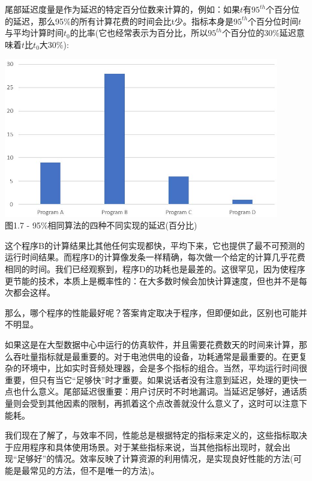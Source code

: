 尾部延迟度量是作为延迟的特定百分位数来计算的，例如：如果$ t $有$95^{th}$个百分位的延迟，那么95\%的所有计算花费的时间会比t少。指标本身是$95^{th}$个百分位时间$ t $与平均计算时间$ t_0 $的比率(它也经常表示为百分比，所以$95^{th}$个百分位的30\%延迟意味着$ t $比$ t_0 $大30\%):

\begin{center}
\includegraphics[width=0.9\textwidth]{content/1/chapter1/images/7.jpg}\\
图1.7 - 95\%相同算法的四种不同实现的延迟(百分比)
\end{center}

这个程序B的计算结果比其他任何实现都快，平均下来，它也提供了最不可预测的运行时间结果。而程序D的计算像发条一样精确，每次做一个给定的计算几乎花费相同的时间。我们已经观察到，程序D的功耗也是最差的。这很罕见，因为使程序更节能的技术，本质上是概率性的：在大多数时候会加快计算速度，但也并不是每次都会这样。

那么，哪个程序的性能最好呢？答案肯定取决于程序，但即便如此，区别也可能并不明显。


如果这是在大型数据中心中运行的仿真软件，并且需要花费数天的时间来计算，那么吞吐量指标就是最重要的。对于电池供电的设备，功耗通常是最重要的。在更复杂的环境中，比如实时音频处理器，会是多个指标的组合。当然，平均运行时间很重要，但只有当它“足够快”时才重要。如果说话者没有注意到延迟，处理的更快一点也什么意义。尾部延迟很重要：用户讨厌时不时地漏词。当延迟足够好，通话质量则会受到其他因素的限制，再抓着这个点改善就没什么意义了，这时可以注意下能耗。

我们现在了解了，与效率不同，性能总是根据特定的指标来定义的，这些指标取决于应用程序和具体使用场景。对于某些指标来说，当其他指标出现时，就会出现“足够好”的情况。效率反映了计算资源的利用情况，是实现良好性能的方法(可能是最常见的方法，但不是唯一的方法)。











